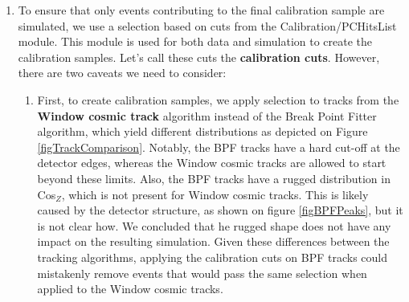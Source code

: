 \documentclass[12pt]{article}
\begin{document}
\begin{enumerate}
\item To ensure that only events contributing to the final calibration sample are simulated, we use a selection based on cuts from the Calibration/PCHitsList module. This module is used for both data and simulation to create the calibration samples. Let's call these cuts the \textbf{calibration cuts}. However, there are two caveats we need to consider:
\begin{enumerate}
\item First, to create calibration samples, we apply selection to tracks from the \textbf{Window cosmic track} algorithm instead of the Break Point Fitter algorithm, which yield different distributions as depicted on Figure \ref{figTrackComparison}. Notably, the BPF tracks have a hard cut-off at the detector edges, whereas the Window cosmic tracks are allowed to start beyond these limits. Also, the BPF tracks have a rugged distribution in Cos$_Z$, which is not present for Window cosmic tracks. This is likely caused by the detector structure, as shown on figure \ref{figBPFPeaks}, but it is not clear how. We concluded that he rugged shape does not have any impact on the resulting simulation. Given these differences between the tracking algorithms, applying the calibration cuts on BPF tracks could mistakenly remove events that would pass the same selection when applied to the Window cosmic tracks.


\end{enumerate}
\end{enumerate}
\end{document}
